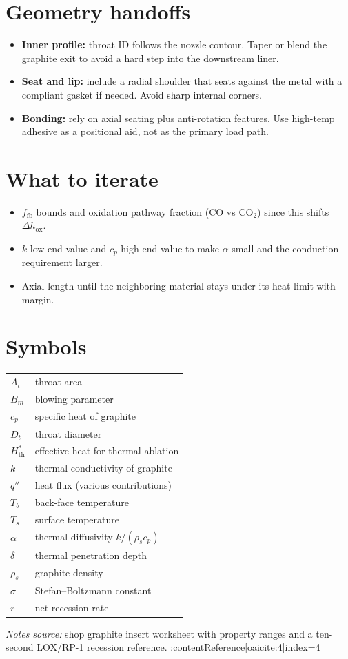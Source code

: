 \documentclass[11pt]{article}
\begin{document}
\section{Geometry handoffs}
\begin{itemize}
  \item \textbf{Inner profile:} throat ID follows the nozzle contour. Taper or blend the graphite exit to avoid a hard step into the downstream liner.
  \item \textbf{Seat and lip:} include a radial shoulder that seats against the metal with a compliant gasket if needed. Avoid sharp internal corners.
  \item \textbf{Bonding:} rely on axial seating plus anti-rotation features. Use high-temp adhesive as a positional aid, not as the primary load path.
\end{itemize}

\section{What to iterate}
\begin{itemize}
  \item $f_{\mathrm{fb}}$ bounds and oxidation pathway fraction (CO vs CO$_2$) since this shifts $\Delta h_{\mathrm{ox}}$.
  \item $k$ low-end value and $c_p$ high-end value to make $\alpha$ small and the conduction requirement larger.
  \item Axial length until the neighboring material stays under its heat limit with margin.
\end{itemize}

\section*{Symbols}
\begin{tabular}{@{}ll@{}}
$A_t$ & throat area \\
$B_m$ & blowing parameter \\
$c_p$ & specific heat of graphite \\
$D_t$ & throat diameter \\
$H^\ast_{\mathrm{th}}$ & effective heat for thermal ablation \\
$k$ & thermal conductivity of graphite \\
$q''$ & heat flux (various contributions) \\
$T_b$ & back-face temperature \\
$T_s$ & surface temperature \\
$\alpha$ & thermal diffusivity $k/(\rho_s c_p)$ \\
$\delta$ & thermal penetration depth \\
$\rho_s$ & graphite density \\
$\sigma$ & Stefan–Boltzmann constant \\
$\dot r$ & net recession rate
\end{tabular}

\vfill
\noindent\textit{Notes source:} shop graphite insert worksheet with property ranges and a ten-second LOX/RP-1 recession reference. :contentReference[oaicite:4]{index=4}
\end{document}
